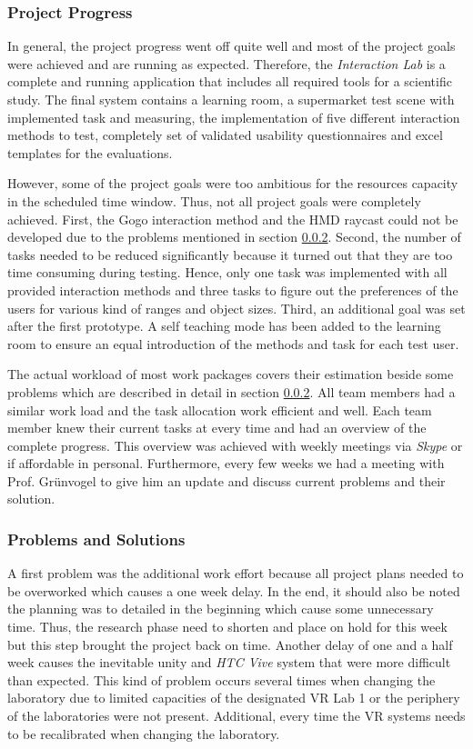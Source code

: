 \subsubsection{Project Progress}

In general, the project progress went off quite well and most of the project goals were achieved and are running as expected. Therefore, the \textit{Interaction Lab} is a complete and running application that includes all required tools for a scientific study. The final system contains a learning room, a supermarket test scene with implemented task and measuring, the implementation of five different interaction methods to test, completely set of validated usability questionnaires and excel templates for the evaluations.

However, some of the project goals were too ambitious for the resources capacity in the scheduled time window. Thus, not all project goals were completely achieved. First, the Gogo interaction method and the HMD raycast could not be developed due to the problems mentioned in section \ref{sec:PMProblems}. Second, the number of tasks needed to be reduced significantly because it turned out that they are too time consuming during testing. Hence, only one task was implemented with all provided interaction methods and three tasks to figure out the preferences of the users for various kind of ranges and object sizes. Third, an additional goal was set after the first prototype. A self teaching mode has been added to the learning room to ensure an equal introduction of the methods and task for each test user.

The actual workload of most work packages covers their estimation beside some problems which are described in detail in section \ref{sec:PMProblems}. All team members had a similar work load and the task allocation work efficient and well. Each team member knew their current tasks at every time and had an overview of the complete progress. This overview was achieved with weekly meetings via \textit{Skype} or if affordable in personal. Furthermore, every few weeks we had a meeting with Prof. Grünvogel to give him an update and discuss current problems and their solution.


\subsubsection{Problems and Solutions}\label{sec:PMProblems}

A first problem was the additional work effort because all project plans needed to be overworked which causes a one week delay. In the end, it should also be noted the planning was to detailed in the beginning which cause some unnecessary time. Thus, the research phase need to shorten and place on hold for this week but this step brought the project back on time. Another delay of one and a half week causes the inevitable unity and \textit{HTC Vive} system that were more difficult than expected. This kind of problem occurs several times when changing the laboratory due to limited capacities of the designated VR Lab 1 or the periphery of the laboratories were not present. Additional, every time the VR systems needs to be recalibrated when changing the laboratory.

